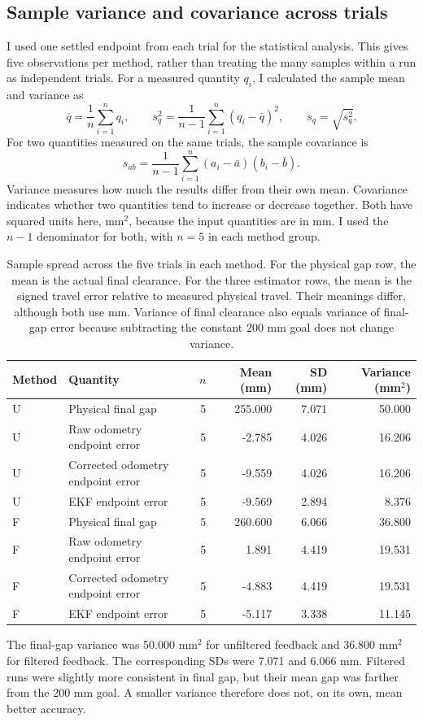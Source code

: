 \subsection{Sample variance and covariance across trials}
I used one settled endpoint from each trial for the statistical analysis. This gives five observations per method, rather than treating the many samples within a run as independent trials. For a measured quantity $q_i$, I calculated the sample mean and variance as
\[
\bar q=\frac{1}{n}\sum_{i=1}^{n}q_i,\qquad
s_q^2=\frac{1}{n-1}\sum_{i=1}^{n}(q_i-\bar q)^2,\qquad s_q=\sqrt{s_q^2}.
\]
For two quantities measured on the same trials, the sample covariance is
\[
s_{ab}=\frac{1}{n-1}\sum_{i=1}^{n}(a_i-\bar a)(b_i-\bar b).
\]
Variance measures how much the results differ from their own mean. Covariance indicates whether two quantities tend to increase or decrease together. Both have squared units here, mm$^2$, because the input quantities are in mm. I used the $n-1$ denominator for both, with $n=5$ in each method group.
\begin{table}[H]\centering\small
\begin{tabular}{llrrrr}
\toprule
Method & Quantity & $n$ & Mean (mm) & SD (mm) & Variance (mm$^2$)\\\midrule
U & Physical final gap & 5 & 255.000 & 7.071 & 50.000\\
U & Raw odometry endpoint error & 5 & -2.785 & 4.026 & 16.206\\
U & Corrected odometry endpoint error & 5 & -9.559 & 4.026 & 16.206\\
U & EKF endpoint error & 5 & -9.569 & 2.894 & 8.376\\
F & Physical final gap & 5 & 260.600 & 6.066 & 36.800\\
F & Raw odometry endpoint error & 5 & 1.891 & 4.419 & 19.531\\
F & Corrected odometry endpoint error & 5 & -4.883 & 4.419 & 19.531\\
F & EKF endpoint error & 5 & -5.117 & 3.338 & 11.145\\
\bottomrule
\end{tabular}
\caption{Sample spread across the five trials in each method. For the physical gap row, the mean is the actual final clearance. For the three estimator rows, the mean is the signed travel error relative to measured physical travel. Their meanings differ, although both use mm. Variance of final clearance also equals variance of final-gap error because subtracting the constant 200 mm goal does not change variance.}
\end{table}
The final-gap variance was 50.000 mm$^2$ for unfiltered feedback and 36.800 mm$^2$ for filtered feedback. The corresponding SDs were 7.071 and 6.066 mm. Filtered runs were slightly more consistent in final gap, but their mean gap was farther from the 200 mm goal. A smaller variance therefore does not, on its own, mean better accuracy.

